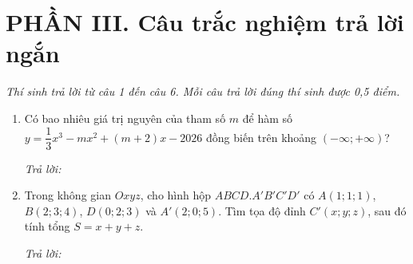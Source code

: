 \documentclass[12pt,a4paper]{article}
\newcommand{\otraloi}{\par\nobreak\smallskip\noindent\textit{Trả lời:}\quad\fbox{\rule{0pt}{11pt}\makebox[0.3cm]{}}\,\fbox{\rule{0pt}{11pt}\makebox[0.3cm]{}}\,\fbox{\rule{0pt}{11pt}\makebox[0.3cm]{}}\,\fbox{\rule{0pt}{11pt}\makebox[0.3cm]{}}}
\begin{document}
\vspace{3pt}
\section*{\large PHẦN III. Câu trắc nghiệm trả lời ngắn}
\textit{Thí sinh trả lời từ câu 1 đến câu 6. Mỗi câu trả lời đúng thí sinh được 0,5 điểm.}
\begin{enumerate}
\item Có bao nhiêu giá trị nguyên của tham số $m$ để hàm số $y=\dfrac{1}{3}x^3-mx^2+(m+2)x-2026$ đồng biến trên khoảng $(-\infty;+\infty)$?
\otraloi

\item Trong không gian $Oxyz$, cho hình hộp $ABCD.A'B'C'D'$ có $A(1;1;1)$, $B(2;3;4)$, $D(0;2;3)$ và $A'(2;0;5)$. Tìm tọa độ đỉnh $C'(x;y;z)$, sau đó tính tổng $S=x+y+z$.
\otraloi
\end{enumerate}
\end{document}
